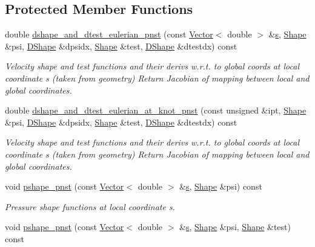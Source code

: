 \subsection*{Protected Member Functions}
\begin{DoxyCompactItemize}
\item 
double \hyperlink{classoomph_1_1PolarTaylorHoodElement_a5f7b5059497c7d24e5804e1ff9cd34b2}{dshape\+\_\+and\+\_\+dtest\+\_\+eulerian\+\_\+pnst} (const \hyperlink{classoomph_1_1Vector}{Vector}$<$ double $>$ \&\hyperlink{cfortran_8h_ab7123126e4885ef647dd9c6e3807a21c}{s}, \hyperlink{classoomph_1_1Shape}{Shape} \&psi, \hyperlink{classoomph_1_1DShape}{D\+Shape} \&dpsidx, \hyperlink{classoomph_1_1Shape}{Shape} \&test, \hyperlink{classoomph_1_1DShape}{D\+Shape} \&dtestdx) const
\begin{DoxyCompactList}\small\item\em Velocity shape and test functions and their derivs w.\+r.\+t. to global coords at local coordinate s (taken from geometry) Return Jacobian of mapping between local and global coordinates. \end{DoxyCompactList}\item 
double \hyperlink{classoomph_1_1PolarTaylorHoodElement_aa49d0cf54061ffd19e6454794efec7dc}{dshape\+\_\+and\+\_\+dtest\+\_\+eulerian\+\_\+at\+\_\+knot\+\_\+pnst} (const unsigned \&ipt, \hyperlink{classoomph_1_1Shape}{Shape} \&psi, \hyperlink{classoomph_1_1DShape}{D\+Shape} \&dpsidx, \hyperlink{classoomph_1_1Shape}{Shape} \&test, \hyperlink{classoomph_1_1DShape}{D\+Shape} \&dtestdx) const
\begin{DoxyCompactList}\small\item\em Velocity shape and test functions and their derivs w.\+r.\+t. to global coords at local coordinate s (taken from geometry) Return Jacobian of mapping between local and global coordinates. \end{DoxyCompactList}\item 
void \hyperlink{classoomph_1_1PolarTaylorHoodElement_a017ced81001a0b0cbeaf4701ef2d4792}{pshape\+\_\+pnst} (const \hyperlink{classoomph_1_1Vector}{Vector}$<$ double $>$ \&\hyperlink{cfortran_8h_ab7123126e4885ef647dd9c6e3807a21c}{s}, \hyperlink{classoomph_1_1Shape}{Shape} \&psi) const
\begin{DoxyCompactList}\small\item\em Pressure shape functions at local coordinate s. \end{DoxyCompactList}\item 
void \hyperlink{classoomph_1_1PolarTaylorHoodElement_ad382221466572628efe24ae3c0be7291}{pshape\+\_\+pnst} (const \hyperlink{classoomph_1_1Vector}{Vector}$<$ double $>$ \&\hyperlink{cfortran_8h_ab7123126e4885ef647dd9c6e3807a21c}{s}, \hyperlink{classoomph_1_1Shape}{Shape} \&psi, \hyperlink{classoomph_1_1Shape}{Shape} \&test) const

\end{DoxyCompactItemize}
